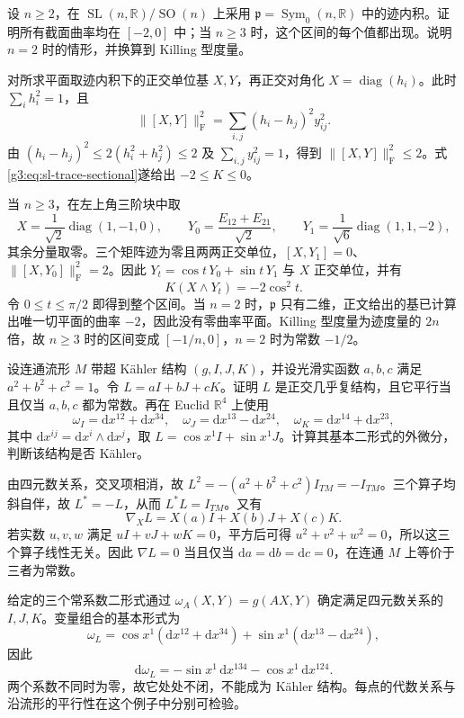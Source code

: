 \begin{exercise}\label{g3:ex:sl-sectional-sharp-range}
	设 \(n\ge2\)，在 \(\operatorname{SL}(n,\mathbb R)/\operatorname{SO}(n)\) 上采用 \(\mathfrak p=\operatorname{Sym}_0(n,\mathbb R)\) 中的迹内积。证明所有截面曲率均在 \([-2,0]\) 中；当 \(n\ge3\) 时，这个区间的每个值都出现。说明 \(n=2\) 时的情形，并换算到 Killing 型度量。
\end{exercise}
\begin{solution}
	对所求平面取迹内积下的正交单位基 \(X,Y\)，再正交对角化 \(X=\operatorname{diag}(h_i)\)。此时 \(\sum_i h_i^2=1\)，且
	\[
		\lVert[X,Y]\rVert_{\mathrm F}^2
		=\sum_{i,j}(h_i-h_j)^2y_{ij}^2.
	\]
	由 \((h_i-h_j)^2\le2(h_i^2+h_j^2)\le2\) 及 \(\sum_{i,j}y_{ij}^2=1\)，得到 \(\lVert[X,Y]\rVert_{\mathrm F}^2\le2\)。式\eqref{g3:eq:sl-trace-sectional}遂给出 \(-2\le K\le0\)。

	当 \(n\ge3\)，在左上角三阶块中取
	\[
		X=\frac1{\sqrt2}\operatorname{diag}(1,-1,0),\qquad
		Y_0=\frac{E_{12}+E_{21}}{\sqrt2},\qquad
		Y_1=\frac1{\sqrt6}\operatorname{diag}(1,1,-2),
	\]
	其余分量取零。三个矩阵迹为零且两两正交单位，\([X,Y_1]=0\)、\(\lVert[X,Y_0]\rVert_{\mathrm F}^2=2\)。因此 \(Y_t=\cos t\,Y_0+\sin t\,Y_1\) 与 \(X\) 正交单位，并有
	\[
		K(X\wedge Y_t)=-2\cos^2t.
	\]
	令 \(0\le t\le\pi/2\) 即得到整个区间。当 \(n=2\) 时，\(\mathfrak p\) 只有二维，正文给出的基已计算出唯一切平面的曲率 \(-2\)，因此没有零曲率平面。Killing 型度量为迹度量的 \(2n\) 倍，故 \(n\ge3\) 时的区间变成 \([-1/n,0]\)，\(n=2\) 时为常数 \(-1/2\)。
\end{solution}

\begin{optionalexercise}\label{g3:ex:varying-hyperkahler-sphere}
	设连通流形 \(M\) 带超 Kähler 结构 \((g,I,J,K)\)，并设光滑实函数 \(a,b,c\) 满足 \(a^2+b^2+c^2=1\)。令 \(L=aI+bJ+cK\)。证明 \(L\) 是正交几乎复结构，且它平行当且仅当 \(a,b,c\) 都为常数。再在 Euclid \(\mathbb R^4\) 上使用
	\[
		\omega_I=\mathrm dx^{12}+\mathrm dx^{34},\quad
		\omega_J=\mathrm dx^{13}-\mathrm dx^{24},\quad
		\omega_K=\mathrm dx^{14}+\mathrm dx^{23},
	\]
	其中 \(\mathrm dx^{ij}=\mathrm dx^i\wedge\mathrm dx^j\)，取 \(L=\cos x^1 I+\sin x^1 J\)。计算其基本二形式的外微分，判断该结构是否 Kähler。
\end{optionalexercise}
\begin{solution}
	由四元数关系，交叉项相消，故 \(L^2=-(a^2+b^2+c^2)I_{TM}=-I_{TM}\)。三个算子均斜自伴，故 \(L^*=-L\)，从而 \(L^*L=I_{TM}\)。又有
	\[
		\nabla_XL=X(a)I+X(b)J+X(c)K.
	\]
	若实数 \(u,v,w\) 满足 \(uI+vJ+wK=0\)，平方后可得 \(u^2+v^2+w^2=0\)，所以这三个算子线性无关。因此 \(\nabla L=0\) 当且仅当 \(\mathrm da=\mathrm db=\mathrm dc=0\)，在连通 \(M\) 上等价于三者为常数。

	给定的三个常系数二形式通过 \(\omega_A(X,Y)=g(AX,Y)\) 确定满足四元数关系的 \(I,J,K\)。变量组合的基本形式为
	\[
		\omega_L=\cos x^1(\mathrm dx^{12}+\mathrm dx^{34})
		+\sin x^1(\mathrm dx^{13}-\mathrm dx^{24}),
	\]
	因此
	\[
		\mathrm d\omega_L=-\sin x^1\,\mathrm dx^{134}-\cos x^1\,\mathrm dx^{124}.
	\]
	两个系数不同时为零，故它处处不闭，不能成为 Kähler 结构。每点的代数关系与沿流形的平行性在这个例子中分别可检验。
\end{solution}

